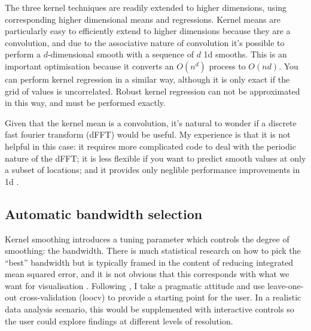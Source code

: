 \documentclass[journal]{vgtc}                %
\begin{document}
The three kernel techniques are readily extended to higher dimensions, using corresponding higher dimensional means and regressions. Kernel means are particularly easy to efficiently extend to higher dimensions  because they are a convolution, and due to the associative nature of convolution it's possible to perform a $d$-dimensional smooth with a sequence of $d$ 1d smooths. This is an important optimisation because it converts an $O(n^d)$ process to $O(nd)$. You can perform kernel regression in a similar way, although it is only exact if the grid of values is uncorrelated. Robust kernel regression can not be approximated in this way, and must be performed exactly.

Given that the kernel mean is a convolution, it's natural to wonder if a discrete fast fourier transform (dFFT) would be useful. My experience is that it is not helpful in this case: it requires more complicated code to deal with the periodic nature of the dFFT; it is less flexible if you want to predict smooth values at only a subset of locations; and it provides only neglible performance improvements in 1d \citep{wand:1994}.

% 

\subsection{Automatic bandwidth selection}

Kernel smoothing introduces a tuning parameter which controls the degree of smoothing: the bandwidth. There is much statistical research on how to pick the ``best'' bandwidth but is typically framed in the content of reducing integrated mean squared error, and it is not obvious that this corresponds with what we want for visualisation \citep{denby:2009}. Following \citep{loader:1999}, I take a pragmatic attitude and use leave-one-out cross-validation ({\sc loocv}) \citep{efron:1983} to provide a starting point for the user. In a realistic data analysis scenario, this would be supplemented with interactive controls so the user could explore findings at different levels of resolution.
\end{document}
